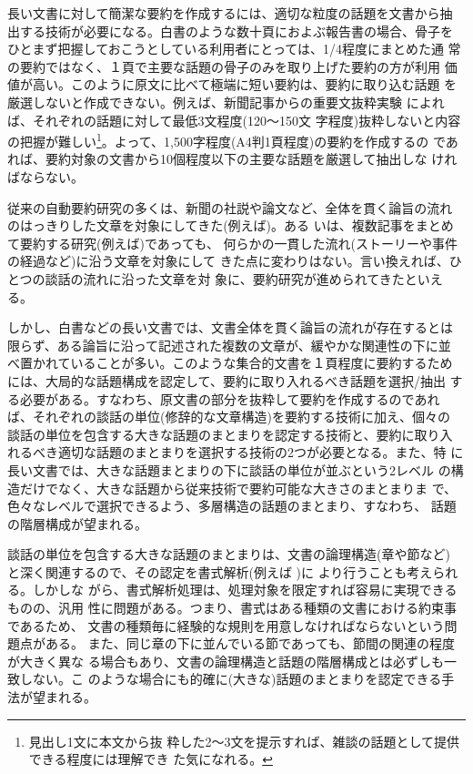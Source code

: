 長い文書に対して簡潔な要約を作成するには、適切な粒度の話題を文書から抽
出する技術が必要になる。白書のような数十頁におよぶ報告書の場合、骨子を
ひとまず把握しておこうとしている利用者にとっては、1/4程度にまとめた通
常の要約ではなく、１頁で主要な話題の骨子のみを取り上げた要約の方が利用
価値が高い。このように原文に比べて極端に短い要約は、要約に取り込む話題
を厳選しないと作成できない。例えば、新聞記事からの重要文抜粋実験
\cite{NL-117-17}によれば、それぞれの話題に対して最低3文程度(120〜150文
字程度)抜粋しないと内容の把握が難しい\footnote {見出し1文に本文から抜
  粋した2〜3文を提示すれば、雑談の話題として提供できる程度には理解でき
  た気になれる。}。よって、1,500字程度(A4判1頁程度)の要約を作成するの
であれば、要約対象の文書から10個程度以下の主要な話題を厳選して抽出しな
ければならない。

従来の自動要約研究の多くは、新聞の社説や論文など、全体を貫く論旨の流れ
のはっきりした文章を対象にしてきた(例えば\cite{J78-D-II-N3P511})。ある
いは、複数記事をまとめて要約する研究(例えば\cite{NL-114-7})であっても、
何らかの一貫した流れ(ストーリーや事件の経過など)に沿う文章を対象にして
きた点に変わりはない。言い換えれば、ひとつの談話の流れに沿った文章を対
象に、要約研究が進められてきたといえる。


しかし、白書などの長い文書では、文書全体を貫く論旨の流れが存在するとは
限らず、ある論旨に沿って記述された複数の文章が、緩やかな関連性の下に並
べ置かれていることが多い。このような集合的文書を１頁程度に要約するため
には、大局的な話題構成を認定して、要約に取り入れるべき話題を選択/抽出
する必要がある。すなわち、原文書の部分を抜粋して要約を作成するのであれ
ば、それぞれの談話の単位(修辞的な文章構造)を要約する技術に加え、個々の
談話の単位を包含する大きな話題のまとまりを認定する技術と、要約に取り入
れるべき適切な話題のまとまりを選択する技術の2つが必要となる。また、特
に長い文書では、大きな話題まとまりの下に談話の単位が並ぶという2レベル
の構造だけでなく、大きな話題から従来技術で要約可能な大きさのまとまりま
で、色々なレベルで選択できるよう、多層構造の話題のまとまり、すなわち、
話題の階層構成が望まれる。



談話の単位を包含する大きな話題のまとまりは、文書の論理構造(章や節など)
と深く関連するので、その認定を書式解析(例えば
\cite{J76-D-II-N9P2042,NLC94-17})に\break
\vspace*{-1mm}より行うことも考えられる。しかしな
がら、書式解析処理は、処理対象を限定すれば容易に実現できるものの、汎用
性に問題がある。つまり、書式はある種類の文書における約束事であるため、
文書の種類毎に経験的な規則を用意しなければならないという問題点がある。
また、同じ章の下に並んでいる節であっても、節間の関連の程度が大きく異な
る場合もあり、文書の論理構造と話題の階層構成とは必ずしも一致しない。こ
のような場合にも的確に(大きな)話題のまとまりを認定できる手法が望まれる。

